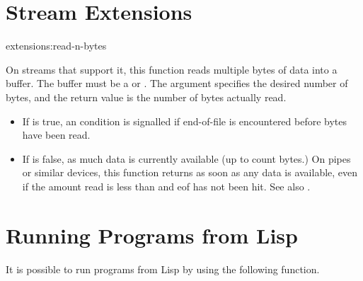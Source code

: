 \section{Stream Extensions}
\begin{defun}{extensions:}{read-n-bytes}{%
    }
  
  On streams that support it, this function reads multiple bytes of
  data into a buffer.  The buffer must be a  or
  .  The argument
   specifies the desired number of bytes, and the return
  value is the number of bytes actually read.
  \begin{itemize}
  \item If  is true, an 
    condition is signalled if end-of-file is encountered before
     bytes have been read.
    
  \item If  is false,  as
    much data is currently available (up to count bytes.)  On pipes or
    similar devices, this function returns as soon as any data is
    available, even if the amount read is less than  and
    eof has not been hit.  See also .
  \end{itemize}
\end{defun}


\section{Running Programs from Lisp}

It is possible to run programs from Lisp by using the following function.

